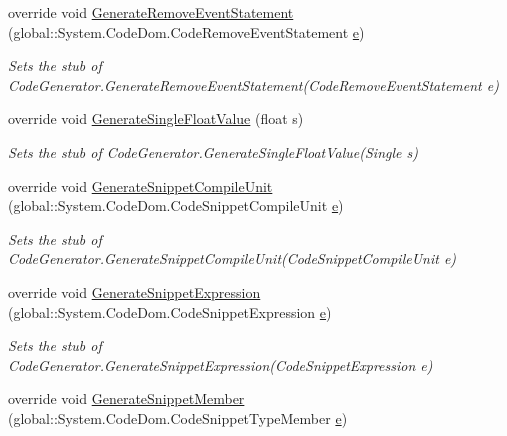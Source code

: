 \begin{DoxyCompactItemize}
override void \hyperlink{class_system_1_1_code_dom_1_1_compiler_1_1_fakes_1_1_stub_code_compiler_a23e1365b1fdd2cf6135b8c4ec7f142b8}{Generate\-Remove\-Event\-Statement} (global\-::\-System.\-Code\-Dom.\-Code\-Remove\-Event\-Statement \hyperlink{jquery-1_810_82_8min_8js_a2c038346d47955cbe2cb91e338edd7e1}{e})
\begin{DoxyCompactList}\small\item\em Sets the stub of Code\-Generator.\-Generate\-Remove\-Event\-Statement(\-Code\-Remove\-Event\-Statement e)\end{DoxyCompactList}\item 
override void \hyperlink{class_system_1_1_code_dom_1_1_compiler_1_1_fakes_1_1_stub_code_compiler_aab0b3a16672f142ffec6eeeb0fc0d746}{Generate\-Single\-Float\-Value} (float s)
\begin{DoxyCompactList}\small\item\em Sets the stub of Code\-Generator.\-Generate\-Single\-Float\-Value(\-Single s)\end{DoxyCompactList}\item 
override void \hyperlink{class_system_1_1_code_dom_1_1_compiler_1_1_fakes_1_1_stub_code_compiler_a2aaab9b84222f5ffbd64888ee619dcbc}{Generate\-Snippet\-Compile\-Unit} (global\-::\-System.\-Code\-Dom.\-Code\-Snippet\-Compile\-Unit \hyperlink{jquery-1_810_82_8min_8js_a2c038346d47955cbe2cb91e338edd7e1}{e})
\begin{DoxyCompactList}\small\item\em Sets the stub of Code\-Generator.\-Generate\-Snippet\-Compile\-Unit(\-Code\-Snippet\-Compile\-Unit e)\end{DoxyCompactList}\item 
override void \hyperlink{class_system_1_1_code_dom_1_1_compiler_1_1_fakes_1_1_stub_code_compiler_a2a15bda8f52104c194eabc65cd80d83b}{Generate\-Snippet\-Expression} (global\-::\-System.\-Code\-Dom.\-Code\-Snippet\-Expression \hyperlink{jquery-1_810_82_8min_8js_a2c038346d47955cbe2cb91e338edd7e1}{e})
\begin{DoxyCompactList}\small\item\em Sets the stub of Code\-Generator.\-Generate\-Snippet\-Expression(\-Code\-Snippet\-Expression e)\end{DoxyCompactList}\item 
override void \hyperlink{class_system_1_1_code_dom_1_1_compiler_1_1_fakes_1_1_stub_code_compiler_a7f2ea2dc41bdd3b5ed7161c23da3ccdb}{Generate\-Snippet\-Member} (global\-::\-System.\-Code\-Dom.\-Code\-Snippet\-Type\-Member \hyperlink{jquery-1_810_82_8min_8js_a2c038346d47955cbe2cb91e338edd7e1}{e})

\end{DoxyCompactItemize}
